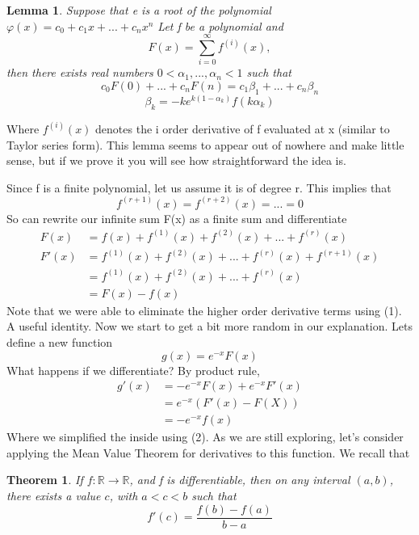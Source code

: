\documentclass{article}
\newtheorem{lemma}{Lemma}
\newtheorem{theorem}{Theorem}
\begin{document}
\begin{lemma}
Suppose that e is a root of the polynomial $\varphi(x)=c_0+c_1 x +...+c_n x^n$ Let f be a polynomial and 
 \[   F(x)=\sum_{i=0}^{\infty} f^{(i)}(x),\]
then there exists real numbers $0<\alpha_1,...,\alpha_n<1$ such that 
\[c_0 F(0)+...+c_n F(n)=c_1 \beta_1+...+c_n \beta_n\]
\[\beta_k=-ke^{k(1-\alpha_k)}f(k\alpha_k)\]
\end{lemma}
\par
Where $f^{(i)}(x)$ denotes the i order derivative of f evaluated at x (similar to Taylor series form). This lemma seems to appear out of nowhere and make little sense, but if we prove it you will see how straightforward the idea is. 
\par
Since f is a finite polynomial, let us assume it is of degree r. This implies that 
\begin{equation}
    f^{(r+1)}(x)=f^{(r+2)}(x)=...=0
\end{equation}
So can rewrite our infinite sum F(x) as a finite sum and differentiate
\begin{equation}
\begin{split}
    F(x)&=f(x)+f^{(1)}(x)+f^{(2)}(x)+...+f^{(r)}(x) \\
    F'(x)&=f^{(1)}(x)+f^{(2)}(x)+...+f^{(r)}(x)+f^{(r+1)}(x) \\
    &=f^{(1)}(x)+f^{(2)}(x)+...+f^{(r)}(x) \\
    &= F(x)-f(x)
    \end{split}
\end{equation}
Note that we were able to eliminate the higher order derivative terms using (1). A useful identity. Now we start to get a bit more random in our explanation. 
  Lets define a new function 
\begin{equation}
    g(x)=e^{-x}F(x)
\end{equation}
What happens if we differentiate? By product rule,
\begin{equation}
    \begin{split}
        g'(x)&= -e^{-x}F(x)+e^{-x}F'(x)\\
        &= e^{-x}(F'(x)-F(X))\\
        &= -e^{-x}f(x)
    \end{split}
\end{equation}
Where we simplified the inside using (2). As we are still exploring, let's consider applying the Mean Value Theorem for derivatives to this function. We recall that
\begin{theorem}
If $f:\mathbb{R}\rightarrow \mathbb{R}$, and f is differentiable, then on any interval $(a,b)$, there exists a value $c$, with $a<c<b$ such that
\[ f'(c)=\frac{f(b)-f(a)}{b-a}\]
\end{theorem}
\end{document}
